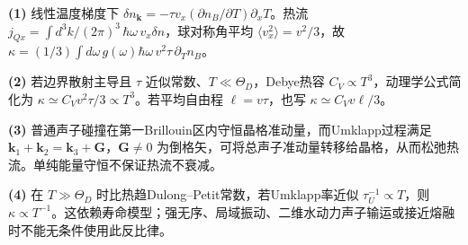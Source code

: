 \par\noindent\textbf{(1)} 线性温度梯度下 \(\delta n_{\boldsymbol k}=-\tau v_x(\partial n_B/\partial T)\partial_xT\)。热流 \(j_{Qx}=\int d^3k/(2\pi)^3\,\hbar\omega\,v_x\delta n\)，球对称角平均 \(\langle v_x^2\rangle=v^2/3\)，故 \(\kappa=(1/3)\int d\omega\,g(\omega)\hbar\omega\,v^2\tau\,\partial_Tn_B\)。
\par\noindent\textbf{(2)} 若边界散射主导且 \(\tau\) 近似常数、\(T\ll\Theta_D\)，Debye热容 \(C_V\propto T^3\)，动理学公式简化为 \(\kappa\simeq C_Vv^2\tau/3\propto T^3\)。若平均自由程 \(\ell=v\tau\)，也写 \(\kappa\simeq C_Vv\ell/3\)。
\par\noindent\textbf{(3)} 普通声子碰撞在第一Brillouin区内守恒晶格准动量，而Umklapp过程满足 \(\boldsymbol k_1+\boldsymbol k_2=\boldsymbol k_3+\boldsymbol G\)，\(\boldsymbol G\ne0\) 为倒格矢，可将总声子准动量转移给晶格，从而松弛热流。单纯能量守恒不保证热流不衰减。
\par\noindent\textbf{(4)} 在 \(T\gg\Theta_D\) 时比热趋Dulong–Petit常数，若Umklapp率近似 \(\tau_U^{-1}\propto T\)，则 \(\kappa\propto T^{-1}\)。这依赖寿命模型；强无序、局域振动、二维水动力声子输运或接近熔融时不能无条件使用此反比律。
